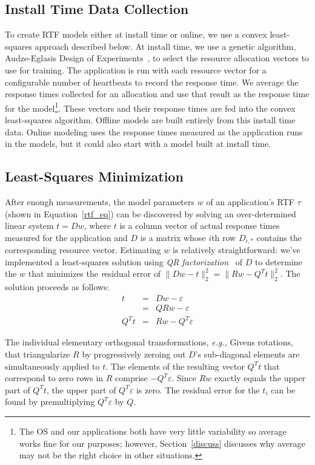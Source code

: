 \subsection{Install Time Data Collection}
To create RTF models either at install time or online, we use a convex
least-squares approach described below.  At install time, we use a
genetic algorithm, Audze-Eglasis Design of
Experiments~\cite{bates-aes03}, to select the resource allocation vectors to use
for training.  The application is run with each resource vector for a configurable number of heartbeats to record the response time.  We average the response times collected for an allocation and use that result as the response time for the model\footnote{The \tess OS and our applications both have very little variability so average works fine for our purposes; however, Section~\ref{discuss} discusses why average may not be the right choice in other situations.}.  These vectors and their response times are fed into the
convex least-squares algorithm. Offline models are built entirely from this install time data.  Online modeling uses the response times measured as the application runs in the models, but it could also start with a model built at install time.

\subsection*{Least-Squares Minimization}
After enough measurements, the model parameters $w$ of an application's RTF $\tau$ (shown in Equation~\ref{rtf_eq})
can be discovered by solving an over-determined linear system $t=Dw$,
where $t$ is a column vector of actual response times measured for the application
and $D$ is a matrix whose $i$th row $D_{i,*}$ contains the corresponding resource vector.
Estimating $w$ is relatively straightforward: we've implemented a least-squares solution using
\emph{QR factorization}~\cite{GoVL} of $D$ to determine the $w$ that minimizes the \emph residual error of
$\|Dw - t\|^2_2 =  \|Rw - Q^Tt\|^2_2$.
The solution proceeds as follows:
\begin{eqnarray*}
t     &=& Dw  - \varepsilon    \\
      &=& QRw - \varepsilon    \\
Q^Tt  &=& Rw  - Q^T\varepsilon
\end{eqnarray*}

The individual elementary orthogonal transformations, \emph{e.g.,} Givens rotations,
that triangularize $R$ by progressively zeroing out $D$'s sub-diagonal elements are simultaneously applied to $t$.
The elements of the resulting vector $Q^Tt$ that correspond to zero rows in $R$ comprise $-Q^T\varepsilon$.
Since $Rw$ exactly equals the upper part of $Q^Tt$, the upper part of $Q^T\varepsilon$ is zero. The residual error for the $t_i$
can be found by premultiplying $Q^T\varepsilon$ by $Q$.

